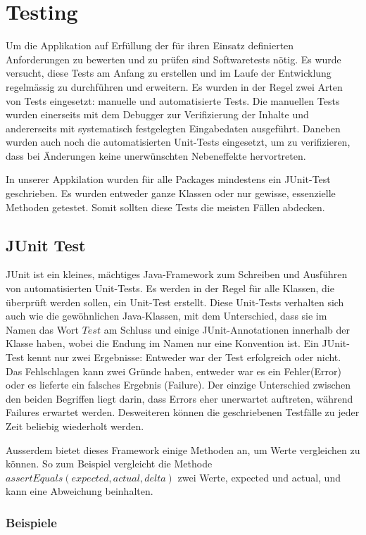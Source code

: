 \section{Testing}
Um die Applikation auf Erfüllung der für ihren Einsatz definierten Anforderungen zu bewerten und zu prüfen sind Softwaretests nötig. Es wurde versucht, diese Tests am Anfang zu erstellen und im Laufe der Entwicklung regelmässig zu durchführen und erweitern. Es wurden in der Regel zwei Arten von Tests eingesetzt: manuelle und automatisierte Tests. Die manuellen Tests wurden einerseits mit dem Debugger zur Verifizierung der Inhalte und andererseits mit systematisch festgelegten Eingabedaten ausgeführt. Daneben wurden auch noch die automatisierten Unit-Tests eingesetzt, um zu verifizieren, dass bei Änderungen keine unerwünschten Nebeneffekte hervortreten. 

In unserer Appkilation wurden für alle Packages mindestens ein JUnit-Test geschrieben. Es wurden entweder ganze Klassen oder nur gewisse, essenzielle Methoden getestet. Somit sollten diese Tests die meisten Fällen abdecken. 

\subsection{JUnit Test}
JUnit ist ein kleines, mächtiges Java-Framework zum Schreiben und Ausführen von automatisierten Unit-Tests. Es werden in der Regel für alle Klassen, die überprüft werden sollen, ein Unit-Test erstellt. Diese Unit-Tests verhalten sich auch wie die gewöhnlichen Java-Klassen, mit dem Unterschied, dass sie im Namen das Wort $Test$ am Schluss und einige JUnit-Annotationen innerhalb der Klasse haben, wobei die Endung im Namen nur eine Konvention ist. Ein JUnit-Test kennt nur zwei Ergebnisse: Entweder war der Test erfolgreich oder nicht. Das Fehlschlagen kann zwei Gründe haben, entweder war es ein Fehler(Error) oder es lieferte ein falsches Ergebnis (Failure). Der einzige Unterschied zwischen den beiden Begriffen liegt darin, dass Errors eher unerwartet auftreten, während Failures erwartet werden. Desweiteren können die geschriebenen Testfälle zu jeder Zeit beliebig wiederholt werden. 

Ausserdem bietet dieses Framework einige Methoden an, um Werte vergleichen zu können. So zum Beispiel vergleicht die Methode $assertEquals(expected, actual, delta)$ zwei Werte, expected und actual, und kann eine Abweichung beinhalten. 

\subsubsection{Beispiele}


